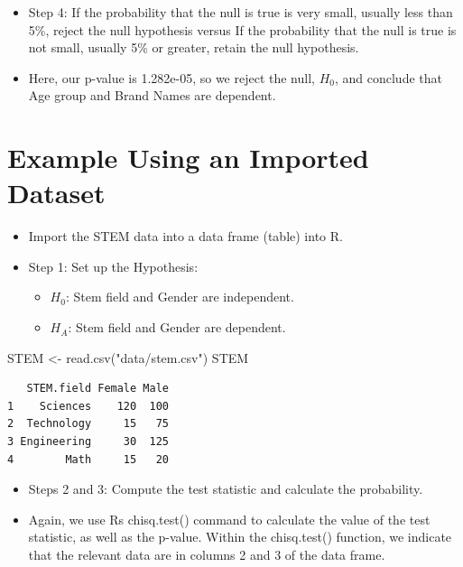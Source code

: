 \documentclass[
  letterpaper,
  DIV=11,
  numbers=noendperiod]{scrreprt}
\newenvironment{Shaded}{\begin{snugshade}}{\end{snugshade}}
\newcommand{\FunctionTok}[1]{\textcolor[rgb]{0.28,0.35,0.67}{#1}}
\newcommand{\NormalTok}[1]{\textcolor[rgb]{0.00,0.23,0.31}{#1}}
\newcommand{\OtherTok}[1]{\textcolor[rgb]{0.00,0.23,0.31}{#1}}
\newcommand{\StringTok}[1]{\textcolor[rgb]{0.13,0.47,0.30}{#1}}
\providecommand{\tightlist}{%
  \setlength{\itemsep}{0pt}\setlength{\parskip}{0pt}}\usepackage{longtable,booktabs,array}
\begin{document}
\begin{itemize}
\tightlist
\item
  Step 4: If the probability that the null is true is very small,
  usually less than 5\%, reject the null hypothesis versus If the
  probability that the null is true is not small, usually 5\% or
  greater, retain the null hypothesis.
\item
  Here, our p-value is 1.282e-05, so we reject the null, \(H_0\), and
  conclude that Age group and Brand Names are dependent.
\end{itemize}

\section{Example Using an Imported
Dataset}\label{example-using-an-imported-dataset}

\begin{itemize}
\tightlist
\item
  Import the STEM data into a data frame (table) into R.
\item
  Step 1: Set up the Hypothesis:

  \begin{itemize}
  \tightlist
  \item
    \(H_0\): Stem field and Gender are independent.
  \item
    \(H_A\): Stem field and Gender are dependent.
  \end{itemize}
\end{itemize}

\begin{Shaded}
\begin{Highlighting}[]
\NormalTok{STEM }\OtherTok{\textless{}{-}} \FunctionTok{read.csv}\NormalTok{(}\StringTok{"data/stem.csv"}\NormalTok{)}
\NormalTok{STEM}
\end{Highlighting}
\end{Shaded}

\begin{verbatim}
   STEM.field Female Male
1    Sciences    120  100
2  Technology     15   75
3 Engineering     30  125
4        Math     15   20
\end{verbatim}

\begin{itemize}
\tightlist
\item
  Steps 2 and 3: Compute the test statistic and calculate the
  probability.
\item
  Again, we use Rs chisq.test() command to calculate the value of the
  test statistic, as well as the p-value. Within the chisq.test()
  function, we indicate that the relevant data are in columns 2 and 3 of
  the data frame.
\end{itemize}
\end{document}
